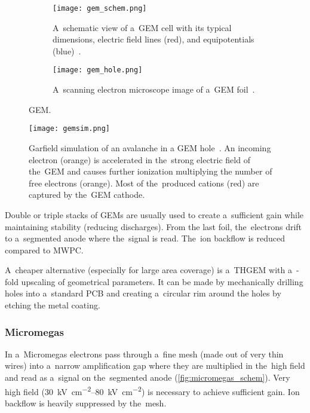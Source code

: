 				\begin{figure}
					\centering
					\begin{subfigure}[t]{0.48\textwidth}
						\centering
						\texttt{[image: gem\_schem.png]}
						\caption{A~schematic view of a~\ac{GEM} cell with its typical dimensions, electric field lines (red), and equipotentials (blue)~\cite{pdg2024}.}
						\label{fig:gem_schem}
					\end{subfigure}
					\hfill
					\begin{subfigure}[t]{0.48\textwidth}
						\centering
						\texttt{[image: gem\_hole.png]}
						\caption{A~scanning electron microscope image of a~\ac{GEM} foil~\cite{gemhole}.}
						\label{fig:gemhole}
					\end{subfigure}
					\caption{\acf{GEM}.}
					\label{fig:gem}
				\end{figure}
				\begin{figure}
					\centering
					\texttt{[image: gemsim.png]}
					\caption{Garfield simulation of an avalanche in a \ac{GEM} hole~\cite{gemsim}. An incoming electron (orange) is accelerated in the~strong electric field of the~\ac{GEM} and causes further ionization multiplying the number of free electrons (orange). Most of the~produced cations (red) are captured by the~\ac{GEM} cathode.}
					\label{fig:gemsim}
				\end{figure}
				
				Double or triple stacks of \acp{GEM} are usually used to create a~sufficient gain while maintaining stability (reducing discharges). From the last foil, the~electrons drift to a~segmented anode where the~signal is read. The~ion backflow is reduced compared to \ac{MWPC}.
				
				A~cheaper alternative (especially for large area coverage) is a~\ac{THGEM} with a~\nobreakdash-fold upscaling of geometrical parameters. It can be made by mechanically drilling holes into a~standard \ac{PCB} and creating a~circular rim around the holes by etching the metal coating.
			
			\subsubsection{Micromegas}
				In a~\ac{Micromegas} electrons pass through a~fine mesh (made out of very thin wires) into a~narrow amplification gap where they are multiplied in the~high field and read as a~signal on the~segmented anode (\cref{fig:micromegas_schem}). Very high field (\qtyrange{30}{80}{\kV\per\cm\squared}) is necessary to achieve sufficient gain. Ion backflow is heavily suppressed by the~mesh. 
				
